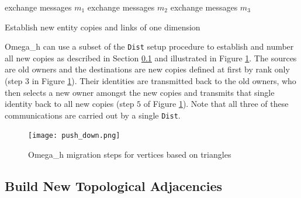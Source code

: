\begin{algorithm}
  exchange messages $m_1$\;
  exchange messages $m_2$\;
  exchange messages $m_3$\;
  \caption{Establish new entity copies and links of one dimension}
  \label{alg:new_links}
\end{algorithm}

Omega\_h can use a subset of the \texttt{Dist} setup procedure
to establish and number all new copies as described in Section
\ref{sec:migr_topo} and illustrated in Figure \ref{fig:push_down}.
The sources are old owners and the destinations are
new copies defined at first by rank only (step $3$ in Figure \ref{fig:push_down}).
Their identities are transmitted back to the old owners, who then
selects a new owner amongst the new copies and transmits that single
identity back to all new copies (step $5$ of Figure \ref{fig:push_down}).
Note that all three of these
communications are carried out by a single \texttt{Dist}.

\begin{figure}[t]\vspace*{4pt}
\centerline{\texttt{[image: push\_down.png]}}
\caption{Omega\_h migration steps for vertices based on triangles}\vspace*{-6pt}
\label{fig:push_down}
\end{figure}

\subsection{Build New Topological Adjacencies}
\label{sec:migr_topo}

